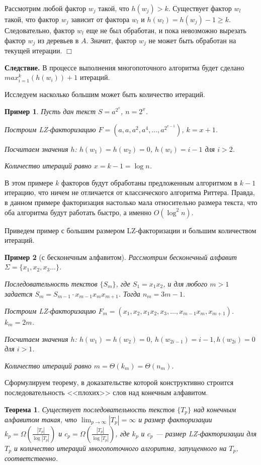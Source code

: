 \documentclass[14pt]{article}
\newtheorem{theorem}{Теорема}[section]
\newtheorem{example}{Пример}[section]
\begin{document}
Рассмотрим любой фактор $w_j$ такой, что $h(w_j) > k$. Существует фактор $w_l$ такой, что
фактор $w_j$ зависит от фактора $w_l$ и $h(w_l) = h(w_j) - 1 \geq k$. Следовательно, фактор $w_l$ еще не был
обработан, и пока невозможно вырезать фактор $w_j$ из деревьев в $A$.
Значит, фактор $w_j$ не может быть обработан на текущей итерации. $\Box$

{\bf Следствие.} В процессе выполнения многопоточного алгоритма будет сделано $max_{i=1}^k(h(w_i)) + 1$ итераций.

Исследуем насколько большим может быть количество итераций.

\begin{example}
	Пусть дан текст $S = a^{2^x}$, $n=2^x$.

	Построим LZ-факторизацию $F = (a, a, a^2, a^4, \ldots, a^{2^{x-1}})$, $k=x+1$.

	Посчитаем значения $h$: $h(w_1) = h(w_2) = 0$, $h(w_i) = i - 1$ для $i>2$.

	Количество итераций равно $x=k-1=\log n$.
\end{example}

В этом примере $k$ факторов будут обработаны предложенным алгоритмом в $k-1$ итерацию,
что ничем не отличается от классического алгоритма Риттера. Правда, в данном примере факторизация
настолько мала относительно размера текста, что оба алгоритма будут работать быстро, а именно $O(\log^2 n)$.

Приведем пример с большим размером LZ-факторизации и большим количеством итераций.

\begin{example}[с бесконечным алфавитом]
	Рассмотрим бесконечный алфавит $\Sigma = \{x_1, x_2, x_3 \ldots \}$.

	Последовательность текстов $\{S_m\}$, где $S_1=x_1x_2$, и для любого $m > 1$
	задается $S_m=S_{m-1} \cdot x_{m-1}x_mx_{m+1}$. Тогда $n_m = 3m-1$.

	Построим LZ-факторизацию $F_m = (x_1, x_2, x_1x_2, x_3, \ldots, x_{m-1}x_m, x_{m+1})$. $k_m=2m$.

	Посчитаем значения $h$: $h(w_1) = h(w_2) = 0$, $h(w_{2i-1}) = i-1, h(w_{2i}) = 0$ для $i>1$.

	Количество итераций равно $m=\Theta(k_m)=\Theta(n_m)$.
\end{example}

Сформулируем теорему, в доказательстве которой конструктивно строится последовательность <<плохих>> слов над конечным алфавитом.

\begin{theorem}
\label{BadWordSequenceTheorem}
	Существует последовательность текстов $\{T_p\}$ над конечным алфавитом такая, что $\lim_{p \to \infty}|T_p| = \infty$
	и размер факторизации $k_p = \Omega\left(\frac{|T_p|}{\log|T_p|}\right)$ и $c_p = \Omega\left(\frac{|T_p|}{\log|T_p|}\right)$, где 
	$k_p$ и $c_p$ --- размер LZ-факторизации для $T_p$ и количество итераций многопоточного алгоритма,
	запущенного на $T_p$, соответственно.
\end{theorem}
\end{document}
